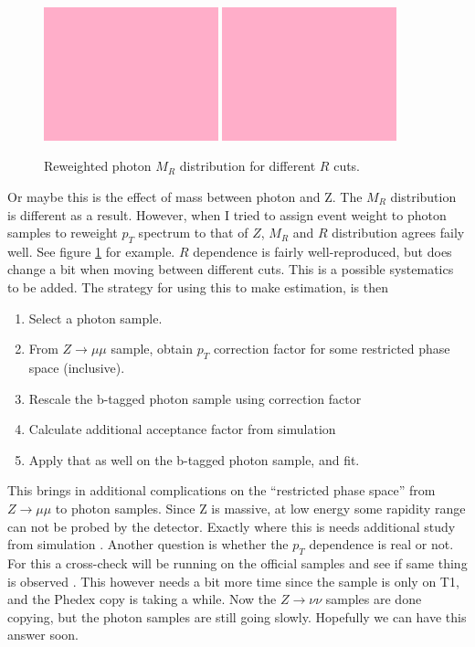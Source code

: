 \begin{figure}
\centering
\includegraphics[width=0.45\textwidth]{ToBeDrawn.png}
\includegraphics[width=0.45\textwidth]{ToBeDrawn.png}
\caption{Reweighted photon $M_R$ distribution for different $R$ cuts.}
\label{Figure_7671_PhotonReweight}
\end{figure}

Or maybe this is the effect of mass between photon and Z.  The $M_R$ distribution
is different as a result.  However, when I tried to assign event weight to photon
samples to reweight $p_T$ spectrum to that of $Z$, $M_R$ and $R$ distribution
agrees faily well.  See figure \ref{Figure_7671_PhotonReweight} for example.
$R$ dependence is fairly well-reproduced, but does change a bit when moving between
different cuts.  This is a possible systematics to be added.
The strategy for using this to make estimation, is then

\begin{enumerate}
\item Select a photon sample.
\item From $Z\rightarrow\mu\mu$ sample, obtain $p_T$ correction factor
for some restricted phase space (inclusive).
\item Rescale the b-tagged photon sample using correction factor
\item Calculate additional acceptance factor from simulation
\item Apply that as well on the b-tagged photon sample, and fit.
\end{enumerate}

This brings in additional complications on the ``restricted phase space'' from $Z\rightarrow\mu\mu$
to photon samples.  Since Z is massive, at low energy some rapidity range can not be probed by the detector.
Exactly where this is needs additional study from simulation \ActionItem .
Another question is whether the $p_T$ dependence is real or not.  For this a cross-check
will be running on the official samples and see if same thing is observed \ActionItem .
This however needs a bit more time since the sample is only on T1, and the Phedex copy is taking
a while.  Now the $Z\rightarrow\nu\nu$ samples are done copying, but the photon samples are
still going slowly.  Hopefully we can have this answer soon.


